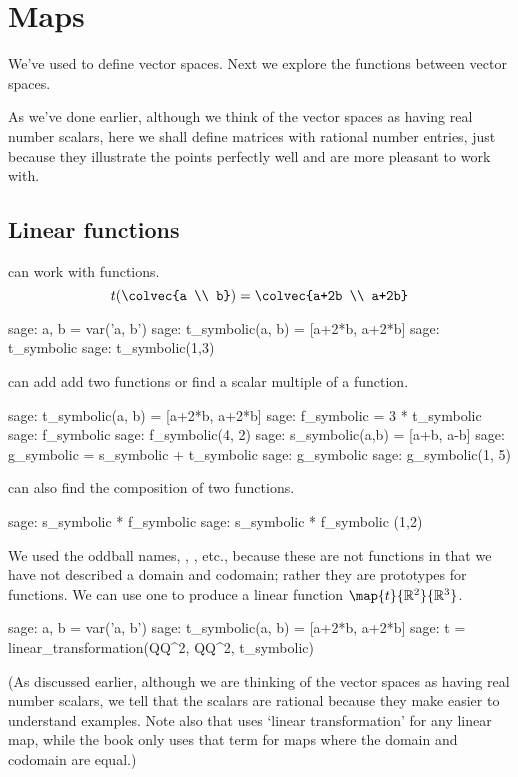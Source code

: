 \chapter{Maps}\label{chapter:maps}


We've used \Sage{} to define vector spaces.
Next we explore the functions between vector spaces.

As we've done earlier, although we think of the vector spaces 
as having real number scalars, here
we shall define matrices with rational number
entries, just because they illustrate the points perfectly well
and are more pleasant to work with.
  

\section{Linear functions} \label{sec:linearfunctions}
\Sage{} can work with functions.
\begin{equation*}
  t(\colvec{a \\ b})
  =\colvec{a+2b \\ a+2b}
\end{equation*}
\begin{sagecommandline}
sage: a, b = var('a, b')   
sage: t_symbolic(a, b) = [a+2*b, a+2*b]         
sage: t_symbolic       
sage: t_symbolic(1,3)       
\end{sagecommandline}

\Sage{} can add add two functions or find a scalar multiple of a function.
\begin{sagecommandline}
sage: t_symbolic(a, b) = [a+2*b, a+2*b]         
sage: f_symbolic = 3 * t_symbolic
sage: f_symbolic
sage: f_symbolic(4, 2)
sage: s_symbolic(a,b) = [a+b, a-b]
sage: g_symbolic = s_symbolic + t_symbolic
sage: g_symbolic
sage: g_symbolic(1, 5) 
\end{sagecommandline}
\Sage{} can also find the composition of two functions.
\begin{sagecommandline}
sage: s_symbolic * f_symbolic
sage: s_symbolic * f_symbolic (1,2)
\end{sagecommandline}

We used the oddball names, 
, , etc.,
because these are not functions in that we have not described a domain
and codomain; rather they are prototypes for functions.  
We can use one to produce a linear function $\map{t}{\Re^2}{\Re^3}$.
\begin{sagecommandline} 
sage: a, b = var('a, b')   
sage: t_symbolic(a, b) = [a+2*b, a+2*b]         
sage: t = linear_transformation(QQ^2, QQ^2, t_symbolic)
\end{sagecommandline}
(As discussed earlier, although we are thinking of the vector spaces
as having real number scalars, we tell \Sage{} that
the scalars are rational because they make easier to understand examples.
Note also that \Sage{} uses `linear transformation' for any linear map,
while the book only uses that term for maps where the domain and codomain
are equal.)

